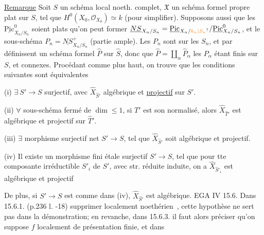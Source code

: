 \uline{Remarque}  Soit $S$  un schéma local noeth. complet,
$\mathfrak X$ un schéma formel propre  plat sur $S$,
tel que $H^0(X_0,\mathcal O_{X_0})\simeq k$ (pour simplifier). Supposons
aussi  que 
les $\underline{\mathrm{Pic}}^0_{X_n/S_n}$ soient plats    qu'on
peut former $\underline{NS}_{X_n/S_n}=\underline{\mathrm{Pic}}_{X_n/\unsure{k_n|S_n}}/\underline{\mathrm{Pic}}^0_{X_n/S_n}$, et
le sous-schéma $P_n=\underline{NS}_{X_n/S_n}^{+}$ (partie ample).
Les $P_n$ sont   sur les $S_n$, et par 
 définissent un schéma formel $\widehat P$ sur $\widehat S$,
donc que $\widehat P=\coprod_{\alpha}\widehat P_\alpha$
les $P_\alpha$ étant finis  sur $S$, et connexes. Procédant
comme plus haut, on trouve que les conditions suivantes
sont équivalentes

(i) $\exists\ S'\to S$   surjectif,  avec $\widehat X_{\widehat S'}$ algébrique
et \uline{projectif} sur $S'$.

(ii) $\forall$ sous-schéma fermé  de $\dim\leq 1$, si $T'$ est son normalisé,
alors $\widehat X_{\widehat T'}$ est algébrique et projectif sur $\widehat T'$.

(iii) $\exists$ morphisme  surjectif net $S'\to S$, tel que
$\widehat X_{\widehat S'}$ soit algébrique et projectif.

(iv) Il existe un morphisme fini étale surjectif $S'\to S$, tel que pour tte composante irréductible
$S'_i$ de $S'$, avec str. réduite induite, on a $\widehat X_{\widehat S'_i}$ est
algébrique et projectif

 De
plus, si $S'\to S$ est comme dans (iv), $\widehat X_{\widehat S'}$ est algébrique.
EGA IV 15.6. Dans 15.6.1. (p.236 l. -18) supprimer \textquotedbl localement
noethérien\textquotedbl\ , cette hypothèse ne sert pas dans la démonstration; en revanche, dans 15.6.3.  il faut alors préciser qu'on suppose $f$ localement
de présentation finie, et dans 


